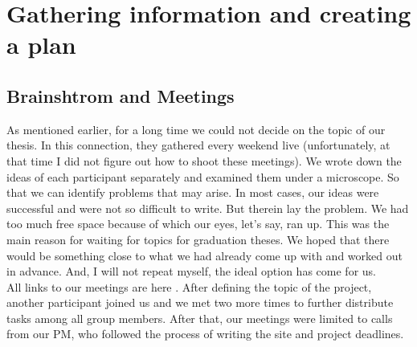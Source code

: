 \chapter{Gathering information and creating a plan}\label{ch:A}
\section{Brainshtrom and Meetings}
As mentioned earlier, for a long time we could not decide on the topic of our thesis. In this connection, they gathered every weekend live (unfortunately, at that time I did not figure out how to shoot these meetings). We wrote down the ideas of each participant separately and examined them under a microscope. So that we can identify problems that may arise. In most cases, our ideas were successful and were not so difficult to write. But therein lay the problem. We had too much free space because of which our eyes, let's say, ran up. This was the main reason for waiting for topics for graduation theses. We hoped that there would be something close to what we had already come up with and worked out in advance. And, I will not repeat myself, the ideal option has come for us.
\\
All links to our meetings are here \cite{youtube}. After defining the topic of the project, another participant joined us and we met two more times to further distribute tasks among all group members. After that, our meetings were limited to calls from our PM, who followed the process of writing the site and project deadlines.

